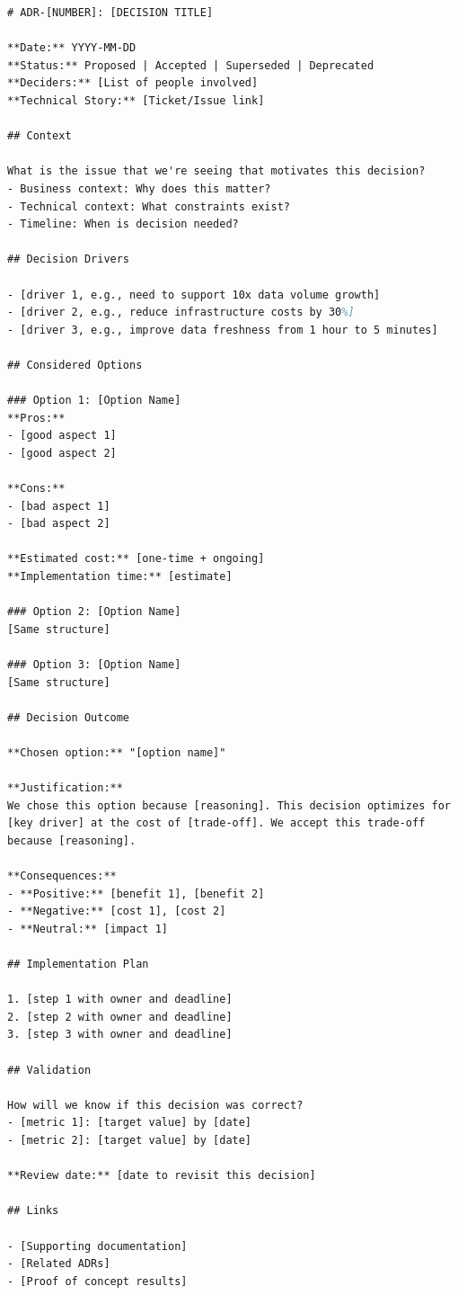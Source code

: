 \begin{lstlisting}[language=tex, caption=ADR Template for Pipeline Architecture]
# ADR-[NUMBER]: [DECISION TITLE]

**Date:** YYYY-MM-DD
**Status:** Proposed | Accepted | Superseded | Deprecated
**Deciders:** [List of people involved]
**Technical Story:** [Ticket/Issue link]

## Context

What is the issue that we're seeing that motivates this decision?
- Business context: Why does this matter?
- Technical context: What constraints exist?
- Timeline: When is decision needed?

## Decision Drivers

- [driver 1, e.g., need to support 10x data volume growth]
- [driver 2, e.g., reduce infrastructure costs by 30%]
- [driver 3, e.g., improve data freshness from 1 hour to 5 minutes]

## Considered Options

### Option 1: [Option Name]
**Pros:**
- [good aspect 1]
- [good aspect 2]

**Cons:**
- [bad aspect 1]
- [bad aspect 2]

**Estimated cost:** [one-time + ongoing]
**Implementation time:** [estimate]

### Option 2: [Option Name]
[Same structure]

### Option 3: [Option Name]
[Same structure]

## Decision Outcome

**Chosen option:** "[option name]"

**Justification:**
We chose this option because [reasoning]. This decision optimizes for
[key driver] at the cost of [trade-off]. We accept this trade-off
because [reasoning].

**Consequences:**
- **Positive:** [benefit 1], [benefit 2]
- **Negative:** [cost 1], [cost 2]
- **Neutral:** [impact 1]

## Implementation Plan

1. [step 1 with owner and deadline]
2. [step 2 with owner and deadline]
3. [step 3 with owner and deadline]

## Validation

How will we know if this decision was correct?
- [metric 1]: [target value] by [date]
- [metric 2]: [target value] by [date]

**Review date:** [date to revisit this decision]

## Links

- [Supporting documentation]
- [Related ADRs]
- [Proof of concept results]
\end{lstlisting}

